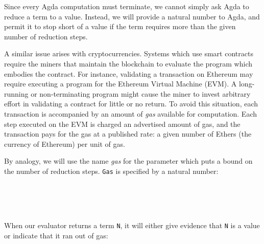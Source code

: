 Since every Agda computation must terminate, we cannot simply ask Agda
to reduce a term to a value. Instead, we will provide a natural number
to Agda, and permit it to stop short of a value if the term requires
more than the given number of reduction steps.

A similar issue arises with cryptocurrencies. Systems which use smart
contracts require the miners that maintain the blockchain to evaluate
the program which embodies the contract. For instance, validating a
transaction on Ethereum may require executing a program for the Ethereum
Virtual Machine (EVM). A long-running or non-terminating program might
cause the miner to invest arbitrary effort in validating a contract for
little or no return. To avoid this situation, each transaction is
accompanied by an amount of \emph{gas} available for computation. Each
step executed on the EVM is charged an advertised amount of gas, and the
transaction pays for the gas at a published rate: a given number of
Ethers (the currency of Ethereum) per unit of gas.

By analogy, we will use the name \emph{gas} for the parameter which puts
a bound on the number of reduction steps. \texttt{Gas} is specified by a
natural number:

\begin{fence}
\begin{code}%
\>[0]\AgdaSpace{}%
\AgdaSpace{}%
\AgdaSymbol{:}\AgdaSpace{}%
\AgdaSpace{}%
\<%
\\
\>[0][@{}l@{\AgdaIndent{0}}]%
\>[2]\AgdaSpace{}%
\<%
\\
%
\>[2]\<%
\\
\>[2][@{}l@{\AgdaIndent{0}}]%
\>[4]\AgdaSpace{}%
\AgdaSymbol{:}\AgdaSpace{}%
\<%
\end{code}
\end{fence}

When our evaluator returns a term \texttt{N}, it will either give
evidence that \texttt{N} is a value or indicate that it ran out of gas:

